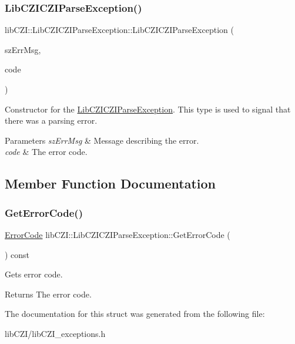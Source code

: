 \subsubsection{\texorpdfstring{Lib\+C\+Z\+I\+C\+Z\+I\+Parse\+Exception()}{LibCZICZIParseException()}}
{\footnotesize\ttfamily lib\+C\+Z\+I\+::\+Lib\+C\+Z\+I\+C\+Z\+I\+Parse\+Exception\+::\+Lib\+C\+Z\+I\+C\+Z\+I\+Parse\+Exception (\begin{DoxyParamCaption}\item[{const char $\ast$}]{sz\+Err\+Msg,  }\item[{\hyperlink{structlib_c_z_i_1_1_lib_c_z_i_c_z_i_parse_exception_a32a6c8ab31a657e490e5c605c97efb40}{Error\+Code}}]{code }\end{DoxyParamCaption})\hspace{0.3cm}{\ttfamily [inline]}}

Constructor for the \hyperlink{structlib_c_z_i_1_1_lib_c_z_i_c_z_i_parse_exception}{Lib\+C\+Z\+I\+C\+Z\+I\+Parse\+Exception}. This type is used to signal that there was a parsing error. 
\begin{DoxyParams}{Parameters}
{\em sz\+Err\+Msg} & Message describing the error. \\
\hline
{\em code} & The error code. \\
\hline
\end{DoxyParams}


\subsection{Member Function Documentation}
\mbox{\label{structlib_c_z_i_1_1_lib_c_z_i_c_z_i_parse_exception_af9f288e1c6b3eea97729bb47b7b61f27}} 
\subsubsection{\texorpdfstring{Get\+Error\+Code()}{GetErrorCode()}}
{\footnotesize\ttfamily \hyperlink{structlib_c_z_i_1_1_lib_c_z_i_c_z_i_parse_exception_a32a6c8ab31a657e490e5c605c97efb40}{Error\+Code} lib\+C\+Z\+I\+::\+Lib\+C\+Z\+I\+C\+Z\+I\+Parse\+Exception\+::\+Get\+Error\+Code (\begin{DoxyParamCaption}{ }\end{DoxyParamCaption}) const\hspace{0.3cm}{\ttfamily [inline]}}

Gets error code. \begin{DoxyReturn}{Returns}
The error code. 
\end{DoxyReturn}


The documentation for this struct was generated from the following file\+:\begin{DoxyCompactItemize}
\item 
lib\+C\+Z\+I/lib\+C\+Z\+I\+\_\+exceptions.\+h\end{DoxyCompactItemize}
